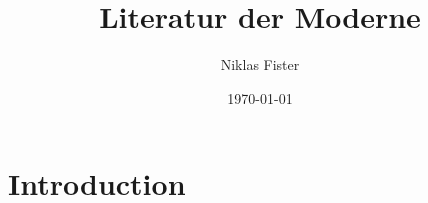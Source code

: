 \documentclass{article}
\title{\huge\textbf{Literatur der Moderne}}
\author{Niklas Fister}
\date{\today}
\begin{document}
\maketitle
\newpage

\section{Introduction}
\end{document}
